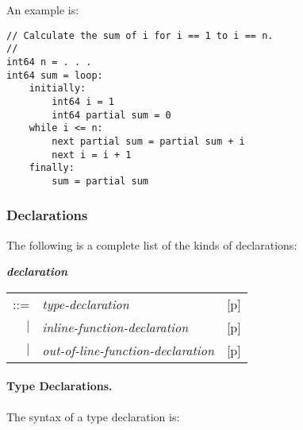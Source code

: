 \documentclass[12pt]{article}
\newcommand{\subsubsubsection}[1]{\paragraph[#1]{#1.}}
\newcommand{\emkey}[1]{{\em \bfseries #1}}
\newcommand{\pagref}[1]{p\pageref{#1}}
\newenvironment{indpar}[1][0.3in]%
	{\begin{list}{}%
		     {\setlength{\itemsep}{0in}%
		      \setlength{\topsep}{0in}%
		      \setlength{\parsep}{1ex}%
		      \setlength{\labelwidth}{#1}%
		      \setlength{\leftmargin}{#1}%
		      \addtolength{\leftmargin}{\labelsep}}%
	 \item}%
	{\end{list}}
\begin{document}
An example is:
\begin{indpar}\begin{verbatim}
// Calculate the sum of i for i == 1 to i == n.
//
int64 n = . . .
int64 sum = loop:
    initially:
        int64 i = 1
        int64 partial sum = 0
    while i <= n:
        next partial sum = partial sum + i
        next i = i + 1
    finally:
        sum = partial sum
\end{verbatim}\end{indpar}

\subsubsection{Declarations}
\label{DECLARATIONS}

The following is a complete list of the kinds of declarations:
\begin{indpar}
\emkey{declaration}\label{DECLARATION}
    \begin{tabular}[t]{@{}rll}
    ::= & {\em type-declaration}
        & [\pagref{TYPE-DECLARATIONS}] \\
    $|$ & {\em inline-function-declaration}
        & [\pagref{INLINE-FUNCTION-DECLARATIONS}] \\
    $|$ & {\em out-of-line-function-declaration}
        & [\pagref{OUT-OF-LINE-FUNCTION-DECLARATIONS}] \\
    \end{tabular}
\end{indpar}

\subsubsubsection{Type Declarations}
\label{TYPE-DECLARATIONS}

The syntax of a type declaration is:
\end{document}
